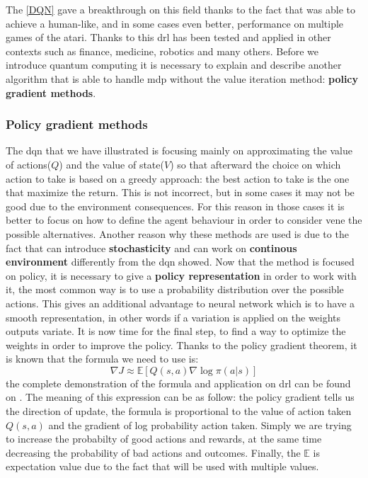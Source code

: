 The \ref{DQN} gave a breakthrough on this field thanks to the fact that was able to achieve a human-like, and in some cases even better, performance on multiple games of the atari. Thanks to this \acrlong{drl} has been tested and applied in other contexts such as finance, medicine, robotics and many others. Before we introduce quantum computing it is necessary to explain and describe another algorithm that is able to handle \acrlong{mdp} without the value iteration method: \textbf{policy gradient methods}.
\subsubsection{Policy gradient methods}
The \acrshort{dqn} that we have illustrated is focusing mainly on approximating the value of actions($Q$) and the value of state($V$) so that afterward the choice on which action to take is based on a greedy approach: the best action to take is the one that maximize the return. This is not incorrect, but in some cases it may not be good due to the environment consequences. For this reason in those cases it is better to focus on how to define the agent behaviour in order to consider vene the possible alternatives. Another reason why these methods are used is due to the fact that can introduce \textbf{stochasticity} and can work on \textbf{continous environment} differently from the \acrshort{dqn} showed.
Now that the method is focused on policy, it is necessary to give a \textbf{policy representation} in order to work with it, the most common way is to use a probability distribution over the possible actions. This gives an additional advantage to neural network which is to have a smooth representation, in other words if a variation is applied on the weights outputs variate.
It is now time for the final step, to find a way to optimize the weights in order to improve the policy. Thanks to the policy gradient theorem, it is known that the formula we need to use is:
\begin{equation}\label{policy_grad_theorem}
	\nabla J \approx \mathbb{E}[Q(s,a) \nabla \log \pi(a|s)]
\end{equation}
the complete demonstration of the formula and application on \acrlong{drl} can be found on \cite{10.5555/3009657.3009806}. The meaning of this expression can be as follow: the policy gradient tells us the direction of update, the formula is proportional to the value of action taken $Q(s,a)$ and the gradient of log probability action taken. Simply we are trying to increase the probabilty of good actions and rewards, at the same time decreasing the probability of bad actions and outcomes. Finally, the $\mathbb{E}$ is expectation value due to the fact that will be used with multiple values.
